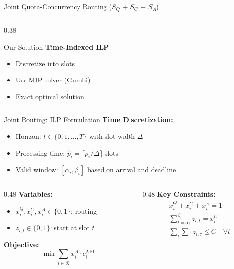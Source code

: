 \documentclass[aspectratio=169,10pt]{beamer}
\begin{document}
\begin{frame}{Joint Quota-Concurrency Routing ($S_Q$ + $S_C$ + $S_A$)}
\begin{columns}[T]
\begin{column}{0.38\textwidth}
\vspace{0.3cm}
\begin{block}{Our Solution}
\textbf{Time-Indexed ILP}
\begin{itemize}
    \item Discretize into slots
    \item Use MIP solver (Gurobi)
    \item Exact optimal solution
\end{itemize}
\end{block}
\end{column}
\end{columns}
\end{frame}

\begin{frame}{Joint Routing: ILP Formulation}
\textbf{Time Discretization:}
\begin{itemize}
    \item Horizon: $t \in \{0, 1, \ldots, T\}$ with slot width $\Delta$
    \item Processing time: $\hat{p}_i = \lceil p_i / \Delta \rceil$ slots
    \item Valid window: $[\alpha_i, \beta_i]$ based on arrival and deadline
\end{itemize}

\vspace{0.3cm}
\begin{columns}[T]
\begin{column}{0.48\textwidth}
\textbf{Variables:}
\begin{itemize}
    \item $x_i^Q, x_i^C, x_i^A \in \{0,1\}$: routing
    \item $z_{i,t} \in \{0,1\}$: start at slot $t$
\end{itemize}

\vspace{0.2cm}
\textbf{Objective:}
\begin{equation*}
\min \sum_{i \in \mathcal{R}} x_i^A \cdot c_i^{\text{API}}
\end{equation*}
\end{column}

\begin{column}{0.48\textwidth}
\textbf{Key Constraints:}
\begin{align*}
&x_i^Q + x_i^C + x_i^A = 1 \\[0.2cm]
&\sum_{t=\alpha_i}^{\beta_i} z_{i,t} = x_i^C \\[0.2cm]
&\sum_i \sum_{\tau} z_{i,\tau} \leq C \quad \forall t
\end{align*}
\end{column}
\end{columns}
\end{frame}
\end{document}
